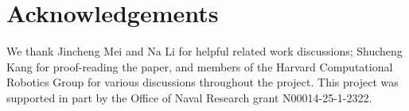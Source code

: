 \documentclass{article}
\begin{document}








\section*{Acknowledgements}\label{sec:acknowledgements}

We thank Jincheng Mei and Na Li for helpful related work discussions; Shucheng Kang for proof-reading the paper, and members of the Harvard Computational Robotics Group for various discussions throughout the project. This project was supported in part by the Office of Naval Research grant N00014-25-1-2322.

% 

% 


\newpage
\appendix
\onecolumn












\end{document}
